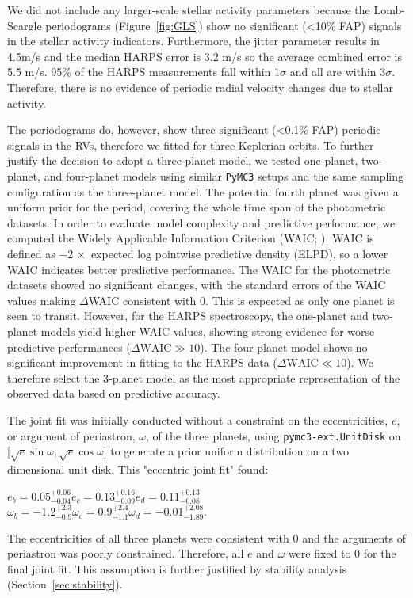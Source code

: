 \documentclass[fleqn,usenatbib,useAMS]{mnras}
\begin{document}
We did not include any larger-scale stellar activity parameters because the Lomb-Scargle periodograms (Figure~\ref{fig:GLS}) show no significant (<10\% FAP) signals in the stellar activity indicators. Furthermore, the jitter parameter results in 4.5m/s and the median HARPS error is 3.2 m/s so the average combined error is 5.5 m/s. 95\% of the HARPS measurements fall within 1$\sigma$ and all are within 3$\sigma$. Therefore, there is no evidence of periodic radial velocity changes due to stellar activity.  

The periodograms do, however, show three significant (<0.1\% FAP) periodic signals in the RVs, therefore we fitted for three Keplerian orbits. To further justify the decision to adopt a three-planet model, we tested one-planet, two-planet, and four-planet models using similar \texttt{PyMC3} setups and the same sampling configuration as the three-planet model. The potential fourth planet was given a uniform prior for the period, covering the whole time span of the photometric datasets. In order to evaluate model complexity and predictive performance, we computed the Widely Applicable Information Criterion (WAIC; \citet{watanabe2010}). WAIC is defined as $ -2\, \times$ expected log pointwise predictive density (ELPD), so a lower WAIC indicates better predictive performance. The WAIC for the photometric datasets showed no significant changes, with the standard errors of the WAIC values making $\Delta$WAIC consistent with 0. This is expected as only one planet is seen to transit. However, for the HARPS spectroscopy, the one-planet and two-planet models yield higher WAIC values, showing strong evidence for worse predictive performances ($\Delta\text{WAIC}\gg10$). The four-planet model shows no significant improvement in fitting to the HARPS data ($\Delta\text{WAIC}\ll10$). We therefore select the 3-planet model as the most appropriate representation of the observed data based on predictive accuracy.

The joint fit was initially conducted without a constraint on the eccentricities, $e$, or argument of periastron, $\omega$, of the three planets, using {\tt pymc3-ext.UnitDisk} on [$\sqrt{e}\sin{\omega}, \sqrt{e}\cos{\omega}$] to generate a prior uniform distribution on a two dimensional unit disk. This "eccentric joint fit" found:\begin{center} $e_b=0.05^{+0.06}_{-0.04}$\quad $e_c=0.13^{+0.16}_{-0.09} $\quad $e_d=0.11^{+0.13}_{-0.08}$\\[2pt] $\omega_b=-1.2^{+2.3}_{-0.9}$\quad $\omega_c
=0.9^{+2.4}_{-1.1}$\quad $\omega_d=-0.01^{+2.08}_{-1.89}$.\\\end{center}  The eccentricities of all three planets were consistent with 0 and the arguments of periastron was poorly constrained. Therefore, all $e$ and $\omega$ were fixed to 0 for the final joint fit. This assumption is further justified by stability analysis (Section~\ref{sec:stability}). 
\end{document}
